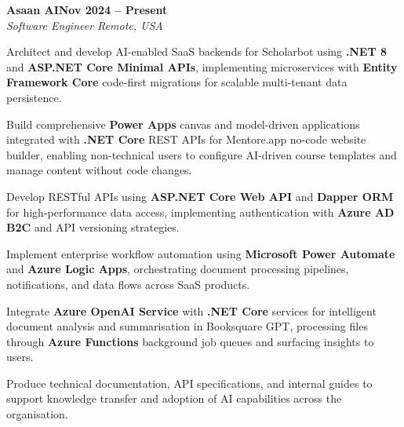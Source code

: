 \documentclass[letterpaper,10pt]{article}
\newcommand{\headingBf}[2]{
  \hspace{10pt}\textbf{#1}\hfill\textbf{#2}\\
}
\newcommand{\headingIt}[2]{
  \hspace{10pt}\textit{#1}\hfill\textit{#2}\\
}
\newenvironment{resume_list}{
  \vspace{-7pt}
  \begin{itemize}[itemsep=-2px, parsep=1pt, leftmargin=30pt]
}{
  \end{itemize}
}
\begin{document}
\headingBf{Asaan AI}{Nov 2024 -- Present}
\headingIt{Software Engineer \hfill Remote, USA}{}
\begin{resume_list}
    \item Architect and develop AI-enabled SaaS backends for Scholarbot using \textbf{.NET 8} and \textbf{ASP.NET Core Minimal APIs}, implementing microservices with \textbf{Entity Framework Core} code-first migrations for scalable multi-tenant data persistence.
    \item Build comprehensive \textbf{Power Apps} canvas and model-driven applications integrated with \textbf{.NET Core} REST APIs for Mentore.app no-code website builder, enabling non-technical users to configure AI-driven course templates and manage content without code changes.
    \item Develop RESTful APIs using \textbf{ASP.NET Core Web API} and \textbf{Dapper ORM} for high-performance data access, implementing authentication with \textbf{Azure AD B2C} and API versioning strategies.
    \item Implement enterprise workflow automation using \textbf{Microsoft Power Automate} and \textbf{Azure Logic Apps}, orchestrating document processing pipelines, notifications, and data flows across SaaS products.
    \item Integrate \textbf{Azure OpenAI Service} with \textbf{.NET Core} services for intelligent document analysis and summarisation in Booksquare GPT, processing files through \textbf{Azure Functions} background job queues and surfacing insights to users.
    \item Produce technical documentation, API specifications, and internal guides to support knowledge transfer and adoption of AI capabilities across the organisation.
\end{resume_list}
\end{document}
